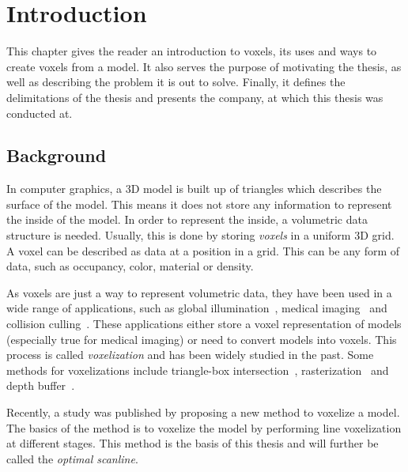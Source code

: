 \chapter{Introduction}\label{cha:intro}
This chapter gives the reader an introduction to voxels, its uses and ways to create voxels from a model.
It also serves the purpose of motivating the thesis, as well as describing the problem it is out to solve.
Finally, it defines the delimitations of the thesis and presents the company, at which this thesis was conducted at.

\section{Background}
In computer graphics, a 3D model is built up of triangles which describes the surface of the model.
This means it does not store any information to represent the inside of the model.
In order to represent the inside, a volumetric data structure is needed.
Usually, this is done by storing \textit{voxels} in a uniform 3D grid.
A voxel can be described as data at a position in a grid.
This can be any form of data, such as occupancy, color, material or density.


As voxels are just a way to represent volumetric data, they have been used in a wide range of applications, such as global illumination~\cite{crassin-VCT}, medical imaging~\cite{marching-cubes,voxel-medicin} and collision culling~\cite{voxel-collision}.
These applications either store a voxel representation of models (especially true for medical imaging) or need to convert models into voxels.
This process is called \textit{voxelization} and has been widely studied in the past.
Some methods for voxelizations include triangle-box intersection~\cite{SAT-voxelization}, rasterization~\cite{octree-voxelization} and depth buffer~\cite{depth-buffer}.

Recently, a study was published by  proposing a new method to voxelize a model.
The basics of the method is to voxelize the model by performing line voxelization at different stages.
This method is the basis of this thesis and will further be called the \textit{optimal scanline}. 

